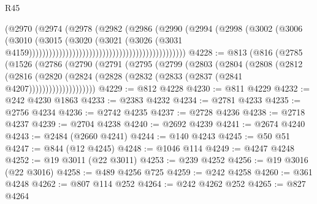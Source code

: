 \begin{lexlean}{R45}
\begin{coremodule}
{                                                                  (@2970
                                                                    (@2974
                                                                      (@2978
                                                                        (@2982
                                                                          (@2986
                                                                            (@2990
                                                                              (@2994
                                                                                (@2998
                                                                                  (@3002
                                                                                    (@3006
                                                                                      (@3010
                                                                                        (@3015
                                                                                          (@3020
                                                                                            (@3021
                                                                                              (@3026
                                                                                                (@3031
                                                                                                  @4159)))))))))))))))))))))))))))))))))))))))))))))))
@4228 := @813
    (@816
      (@2785
        (@1526
          (@2786
            (@2790
              (@2791
                (@2795
                  (@2799
                    (@2803
                      (@2804
                        (@2808
                          (@2812
                            (@2816
                              (@2820
                                (@2824 (@2828 (@2832 (@2833 (@2837 (@2841 @4207))))))))))))))))))))
@4229 := @812 @4228
@4230 := @811 @4229
@4232 := @242 @4230 @1863
@4233 := @2383 @4232
@4234 := @2781 @4233
@4235 := @2756 @4234
@4236 := @2742 @4235
@4237 := @2728 @4236
@4238 := @2718 @4237
@4239 := @2704 @4238
@4240 := @2692 @4239
@4241 := @2674 @4240
@4243 := @2484 (@2660 @4241)
@4244 := @140 @4243
@4245 := @50 @51
@4247 := @844 (@12 @4245)
@4248 := @1046 @114
@4249 := @4247 @4248
@4252 := @19 @3011 (@22 @3011)
@4253 := @239 @4252
@4256 := @19 @3016 (@22 @3016)
@4258 := @489 @4256 @725
@4259 := @242 @4258
@4260 := @361 @4248
@4262 := @807 @114 @252
@4264 := @242 @4262 @252
@4265 := @827 @4264
}
\end{coremodule}
\end{lexlean}
